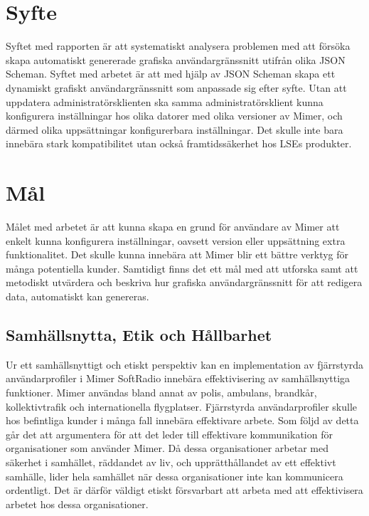 \section{Syfte}
\label{sec:intro:syfte}
Syftet med rapporten är att systematiskt analysera problemen med att försöka skapa automatiskt genererade grafiska användargränssnitt utifrån olika JSON Scheman. Syftet med arbetet är att med hjälp av JSON Scheman skapa ett dynamiskt grafiskt användargränssnitt som anpassade sig efter syfte. Utan att uppdatera administratörsklienten ska samma administratörsklient kunna konfigurera inställningar hos olika datorer med olika versioner av Mimer, och därmed olika uppsättningar konfigurerbara inställningar. Det skulle inte bara innebära stark kompatibilitet utan också framtidssäkerhet hos LSEs produkter.

\section{Mål}
\label{sec:intro:mål}
Målet med arbetet är att kunna skapa en grund för användare av Mimer att enkelt kunna konfigurera inställningar, oavsett version eller uppsättning extra funktionalitet. Det skulle kunna innebära att Mimer blir ett bättre verktyg för många potentiella kunder. Samtidigt finns det ett mål med att utforska samt att metodiskt utvärdera och beskriva hur grafiska användargränssnitt för att redigera data, automatiskt kan genereras.

\subsection{Samhällsnytta, Etik och Hållbarhet}

Ur ett samhällsnyttigt och etiskt perspektiv kan en implementation av fjärrstyrda användarprofiler i Mimer SoftRadio innebära effektivisering av samhällsnyttiga funktioner. Mimer användas bland annat av polis, ambulans, brandkår, kollektivtrafik och internationella flygplatser. Fjärrstyrda användarprofiler skulle hos befintliga kunder i många fall innebära effektivare arbete. Som följd av detta går det att argumentera för att det leder till effektivare kommunikation för organisationer som använder Mimer. Då dessa organisationer arbetar med säkerhet i samhället, räddandet av liv, och upprätthållandet av ett effektivt samhälle, lider hela samhället när dessa organisationer inte kan kommunicera ordentligt. Det är därför väldigt etiskt försvarbart att arbeta med att effektivisera arbetet hos dessa organisationer.

